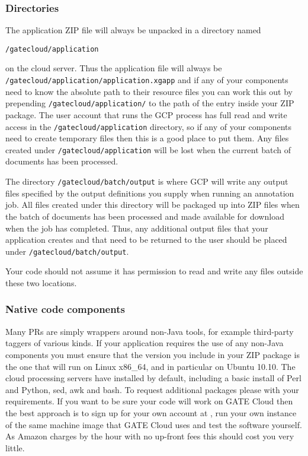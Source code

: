 \subsubsection{Directories}

The application ZIP file will always be unpacked in a directory named
\begin{small}\verb^/gatecloud/application^\end{small} on the cloud server.  
Thus the application file will
always be\\
\verb^/gatecloud/application/application.xgapp^ and if any of your
components need to know the absolute path to their resource files you can work
this out by prepending \verb^/gatecloud/application/^ to the path of the entry
inside your ZIP package.  The user account that runs the GCP process has full
read and write access in the \verb^/gatecloud/application^ directory, so if any of
your components need to create temporary files then this is a good place to put
them.  Any files created under \verb^/gatecloud/application^ will be lost when the
current batch of documents has been processed.

The directory \verb^/gatecloud/batch/output^ is where GCP will write any output
files specified by the output definitions you supply when running an annotation
job.  All files created under this directory will be packaged up into ZIP files
when the batch of documents has been processed and made available for download
when the job has completed.  Thus, any additional output files that your
application creates and that need to be returned to the user should be placed
under \verb^/gatecloud/batch/output^.

Your code should not assume it has permission to read and write any files
outside these two locations.

\subsubsection{Native code components}

Many PRs are simply wrappers around non-Java tools, for example third-party
taggers of various kinds.  If your application requires the use of any non-Java
components you must ensure that the version you include in your ZIP package is
the one that will run on Linux x86\_64, and in particular on Ubuntu 10.10.  The
cloud processing servers have
installed by default, including a basic install of Perl and Python, sed, awk
and bash.  To request additional packages please 
 with
your requirements.  If you want to be sure your code will work on GATE Cloud
then the best approach is to sign up for your own account at
, run your own instance of the
{same machine image} that GATE Cloud uses and test the software yourself.  
As Amazon charges by the hour with no up-front fees this should cost you very 
little.

